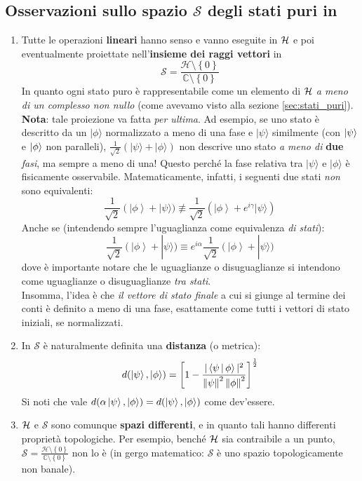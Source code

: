 \documentclass[FisicaTeorica.tex]{subfiles}
\begin{document}
\subsection{Osservazioni sullo spazio $\mathcal{S}$ degli stati puri in \MQ}
\begin{enumerate}
    \item Tutte le operazioni \textbf{lineari} hanno senso e vanno eseguite in $\mathcal{H}$ e poi eventualmente proiettate nell'\textbf{insieme dei raggi vettori} in 
    \[ \mathcal{S}=\frac{\mathcal{H}\setminus\left\{0\right\}}{\mathbb{C}\setminus\left\{0\right\}} \]
    In quanto ogni stato puro è rappresentabile come un elemento di $\mathcal{H}$ \textit{a meno di un complesso non nullo} (come avevamo visto alla sezione \ref{sec:stati_puri}).\\
    \textbf{Nota}: tale proiezione va fatta \textit{per ultima}. Ad esempio, se uno stato è descritto da un $|\phi \rangle$  normalizzato a meno di una fase e $|\psi \rangle$ similmente (con $\Ket{\psi}$ e $\Ket{\phi}$ non paralleli), $\frac{1}{\sqrt2}(|\psi \rangle +|\phi \rangle )$ non descrive uno stato \textit{a meno di} \textbf{due} \textit{fasi}, ma sempre a meno di una! Questo perché la fase relativa tra $|\psi \rangle$  e $|\phi \rangle$ è fisicamente osservabile. Matematicamente, infatti, i seguenti due stati \textit{non} sono equivalenti:
	\[
	\frac{1}{\sqrt2}\left(|\phi\right\rangle+|\psi \rangle )\not\equiv \frac{1}{\sqrt2}(\left|\phi\right\rangle+e^{i\gamma}|\psi \rangle )
	\]
	Anche se (intendendo sempre l'uguaglianza come equivalenza \textit{di stati}):
	\[ \frac{1}{\sqrt2}\left(|\phi\right\rangle+|\psi \rangle )\equiv e^{i\alpha}\frac{1}{\sqrt2}\left(|\phi\right\rangle+|\psi \rangle )
	\]
	dove è importante notare che le uguaglianze o disuguaglianze si intendono come uguaglianze o disuguaglianze \textit{tra stati}.\\
	Insomma, l'idea è che \textit{il vettore di stato finale} a cui si giunge al termine dei conti è definito a meno di una fase, esattamente come tutti i vettori di stato iniziali, se normalizzati.
\item In $\mathcal{S}$ è naturalmente definita una \textbf{distanza} (o metrica):
\[
d(\Ket{\psi},\Ket{\phi}) = \left [ 1-\frac{|\Braket{\psi|\phi}|^2}{\left\lVert\psi\right\rVert^2 \left\lVert\phi\right\rVert^2}\right]^{\frac{1}{2}}
\]
Si noti che vale $d(\alpha\Ket{\psi}, \Ket{\phi}) = d(\Ket{\psi},\Ket{\phi})$ come dev'essere.
\item $\mathcal{H}$ e $\mathcal{S}$ sono comunque \textbf{spazi differenti}, e in quanto tali hanno differenti proprietà topologiche. Per esempio, benché $\mathcal{H}$ sia contraibile a un punto, $\mathcal{S}=\frac{\mathcal{H}\setminus\left\{0\right\}}{\mathbb{C}\setminus\left\{0\right\}}$ non lo è (in gergo matematico: $\mathcal S$ è uno spazio topologicamente non banale).\\

\end{enumerate}
\end{document}
